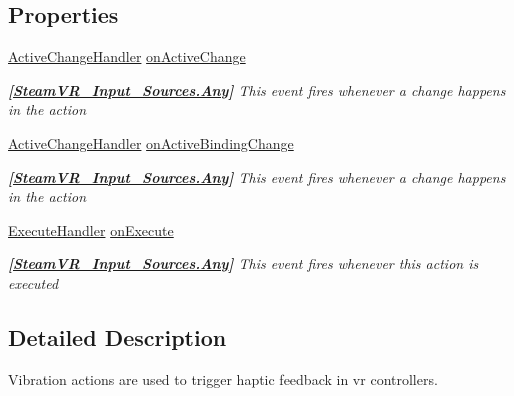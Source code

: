 \subsection*{Properties}
\begin{DoxyCompactItemize}
\item 
\mbox{\hyperlink{class_valve_1_1_v_r_1_1_steam_v_r___action___vibration_a7706b3c9b71de3bea16a3fab8a882f0b}{Active\+Change\+Handler}} \mbox{\hyperlink{class_valve_1_1_v_r_1_1_steam_v_r___action___vibration_a7e76205f9a2f175a2b5a6ad240e1b70a}{on\+Active\+Change}}
\begin{DoxyCompactList}\small\item\em {\bfseries{\mbox{[}\mbox{\hyperlink{namespace_valve_1_1_v_r_a82e5bf501cc3aa155444ee3f0662853faed36a1ef76a59ee3f15180e0441188ad}{Steam\+V\+R\+\_\+\+Input\+\_\+\+Sources.\+Any}}\mbox{]}}} This event fires whenever a change happens in the action \end{DoxyCompactList}\item 
\mbox{\hyperlink{class_valve_1_1_v_r_1_1_steam_v_r___action___vibration_a7706b3c9b71de3bea16a3fab8a882f0b}{Active\+Change\+Handler}} \mbox{\hyperlink{class_valve_1_1_v_r_1_1_steam_v_r___action___vibration_a7a363819140be9e1483eb47fa145255f}{on\+Active\+Binding\+Change}}
\begin{DoxyCompactList}\small\item\em {\bfseries{\mbox{[}\mbox{\hyperlink{namespace_valve_1_1_v_r_a82e5bf501cc3aa155444ee3f0662853faed36a1ef76a59ee3f15180e0441188ad}{Steam\+V\+R\+\_\+\+Input\+\_\+\+Sources.\+Any}}\mbox{]}}} This event fires whenever a change happens in the action \end{DoxyCompactList}\item 
\mbox{\hyperlink{class_valve_1_1_v_r_1_1_steam_v_r___action___vibration_ac075e9e8f3e9eea89be32c403e6f86d5}{Execute\+Handler}} \mbox{\hyperlink{class_valve_1_1_v_r_1_1_steam_v_r___action___vibration_a01bd50ca9598959946e12dc9a22bd05d}{on\+Execute}}
\begin{DoxyCompactList}\small\item\em {\bfseries{\mbox{[}\mbox{\hyperlink{namespace_valve_1_1_v_r_a82e5bf501cc3aa155444ee3f0662853faed36a1ef76a59ee3f15180e0441188ad}{Steam\+V\+R\+\_\+\+Input\+\_\+\+Sources.\+Any}}\mbox{]}}} This event fires whenever this action is executed \end{DoxyCompactList}\end{DoxyCompactItemize}


\subsection{Detailed Description}
Vibration actions are used to trigger haptic feedback in vr controllers. 



